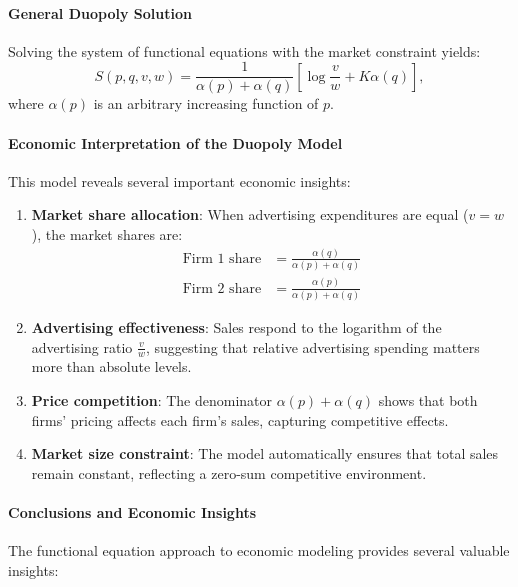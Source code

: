 \paragraph{General Duopoly Solution}
Solving the system of functional equations with the market constraint yields:
\begin{equation}
\boxed{S(p, q, v, w) = \frac{1}{\alpha(p) + \alpha(q)} \left[ \log \frac{v}{w} + K\alpha(q) \right],}
\end{equation}
where $\alpha(p)$ is an arbitrary increasing function of $p$.

\paragraph{Economic Interpretation of the Duopoly Model}
This model reveals several important economic insights:

\begin{enumerate}
\item \textbf{Market share allocation}: When advertising expenditures are equal ($v = w$), the market shares are:
   \begin{align}
   \text{Firm 1 share} &= \frac{\alpha(q)}{\alpha(p) + \alpha(q)} \\
   \text{Firm 2 share} &= \frac{\alpha(p)}{\alpha(p) + \alpha(q)}
   \end{align}
\item \textbf{Advertising effectiveness}: Sales respond to the logarithm of the advertising ratio $\frac{v}{w}$, suggesting that relative advertising spending matters more than absolute levels.
\item \textbf{Price competition}: The denominator $\alpha(p) + \alpha(q)$ shows that both firms' pricing affects each firm's sales, capturing competitive effects.
\item \textbf{Market size constraint}: The model automatically ensures that total sales remain constant, reflecting a zero-sum competitive environment.
\end{enumerate}

\paragraph{Conclusions and Economic Insights}
The functional equation approach to economic modeling provides several valuable insights:

